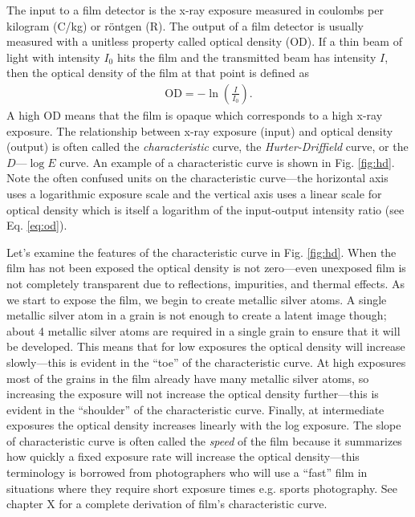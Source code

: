 \documentclass[mphy386-notes.tex]{subfiles}
\begin{document}
The input to a film detector is the x-ray exposure measured in coulombs per
kilogram (C/kg) or r\"{o}ntgen (R). The output of a film detector is usually
measured with a unitless property called optical density (OD). If a thin beam of
light with intensity $I_0$ hits the film and the transmitted beam has intensity
$I$, then the optical density of the film at that point is defined as
\begin{align}
  \text{OD} = -\ln\left(\frac{I}{I_0}\right).\label{eq:od}
\end{align}
A high OD means that the film is opaque which corresponds to a high x-ray
exposure. The relationship between x-ray exposure (input) and optical density
(output) is often called the \textit{characteristic} curve, the
\textit{Hurter-Driffield} curve, or the $D$---$\log E$ curve. An example of a
characteristic curve is shown in Fig. \ref{fig:hd}. Note the often confused
units on the characteristic curve---the horizontal axis uses a logarithmic
exposure scale and the vertical axis uses a linear scale for optical density
which is itself a logarithm of the input-output intensity ratio (see Eq.
\ref{eq:od}).


Let's examine the features of the characteristic curve in Fig. \ref{fig:hd}.
When the film has not been exposed the optical density is not zero---even
unexposed film is not completely transparent due to reflections, impurities, and
thermal effects. As we start to expose the film, we begin to create metallic
silver atoms. A single metallic silver atom in a grain is not enough to create a
latent image though; about 4 metallic silver atoms are required in a single
grain to ensure that it will be developed. This means that for low exposures the
optical density will increase slowly---this is evident in the ``toe'' of the
characteristic curve. At high exposures most of the grains in the film already
have many metallic silver atoms, so increasing the exposure will not increase
the optical density further---this is evident in the ``shoulder'' of the
characteristic curve. Finally, at intermediate exposures the optical density
increases linearly with the log exposure. The slope of characteristic curve is
often called the \textit{speed} of the film because it summarizes how quickly a
fixed exposure rate will increase the optical density---this terminology is
borrowed from photographers who will use a ``fast'' film in situations where
they require short exposure times e.g. sports photography. See \cite{barrett}
chapter X for a complete derivation of film's characteristic curve.
\end{document}
